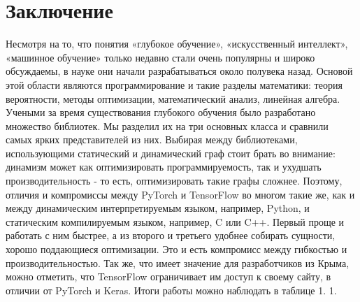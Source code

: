 \documentclass[a4paper]{article}
\begin{document}
\section*{Заключение}

Несмотря на то, что понятия «глубокое обучение», «искусственный интеллект», «машинное обучение» только недавно стали очень популярны и широко обсуждаемы, в науке они начали разрабатываться около полувека назад. Основой этой области являются программирование и такие разделы математики: теория вероятности, методы оптимизации, математический анализ, линейная алгебра. Учеными за время существования глубокого обучения было разработано множество библиотек. Мы разделил их на три основных класса и сравнили самых ярких представителей из них. Выбирая между библиотеками, использующими статический и динамический граф стоит брать во внимание: динамизм может как оптимизировать программируемость, так и ухудшать производительность - то есть, оптимизировать такие графы сложнее. Поэтому, отличия и компромиссы между PyTorch и TensorFlow во многом такие же, как и между динамическим интерпретируемым языком, например, Python, и статическим компилируемым языком, например, C или C++. Первый проще и работать с ним быстрее, а из второго и третьего удобнее собирать сущности, хорошо поддающиеся оптимизации. Это и есть компромисс между гибкостью и производительностью. Так же, что имеет значение для разработчиков из Крыма, можно отметить, что TensorFlow ограничивает им доступ к своему сайту, в отличии от PyTorch и Keras. Итоги работы можно наблюдать в таблице 1. 1.
\end{document}
